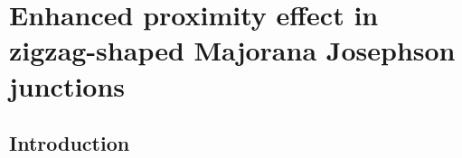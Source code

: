 \chapter{Enhanced proximity effect in zigzag-shaped Majorana Josephson junctions}
\label{ch:zigzag}

\newpage
\noindent 
\section{Introduction}



